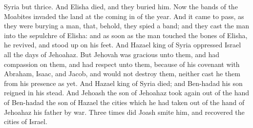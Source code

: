 Syria but thrice.  And Elisha died, and they buried him. Now the bands of the Moabites invaded the land at the coming in of the year. And it came to pass, as they were burying a man, that, behold, they spied a band; and they cast the man into the sepulchre of Elisha: and as soon as the man touched the bones of Elisha, he revived, and stood up on his feet.  And Hazael king of Syria oppressed Israel all the days of Jehoahaz. But Jehovah was gracious unto them, and had compassion on them, and had respect unto them, because of his covenant with Abraham, Isaac, and Jacob, and would not destroy them, neither cast he them from his presence as yet. And Hazael king of Syria died; and Ben-hadad his son reigned in his stead. And Jehoash the son of Jehoahaz took again out of the hand of Ben-hadad the son of Hazael the cities which he had taken out of the hand of Jehoahaz his father by war. Three times did Joash smite him, and recovered the cities of Israel. 


